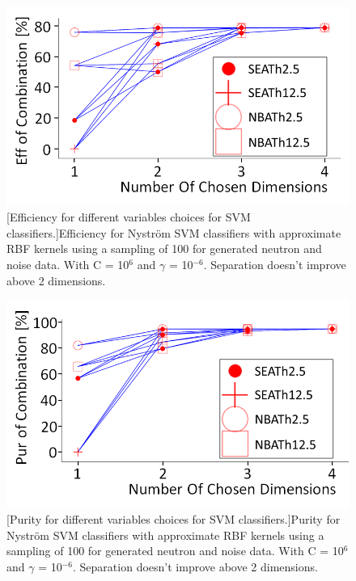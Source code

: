 \begin{figure}[!h]
\centering
\begin{minipage}{.45\textwidth}
  \centering
  \includegraphics[width=\linewidth]{Chapter4/Figs/Raster/effCombSVMAdjustMedText.png}
  [Efficiency for different variables choices for SVM classifiers.]{Efficiency for Nyström SVM classifiers with approximate RBF kernels using a sampling of 100 for generated neutron and noise data. With C = 10$^6$ and $\gamma$ = 10$^{-6}$. Separation doesn't improve above 2 dimensions.} 
  \label{fig:effNeutronSVMC1e6_g1e-6}
\end{minipage}%
\qquad
\begin{minipage}{.45\textwidth}
  \centering
  \includegraphics[width=\linewidth]{Chapter4/Figs/Raster/purCombSVMAdjustMedText.png}
  [Purity for different variables choices for SVM classifiers.]{Purity for Nyström SVM classifiers with approximate RBF kernels using a sampling of 100 for generated neutron and noise data. With C = 10$^6$ and $\gamma$ = 10$^{-6}$. Separation doesn't improve above 2 dimensions.}
  \label{fig:purNeutronSVMC1e6_g1e-6}
\end{minipage}
\end{figure}

